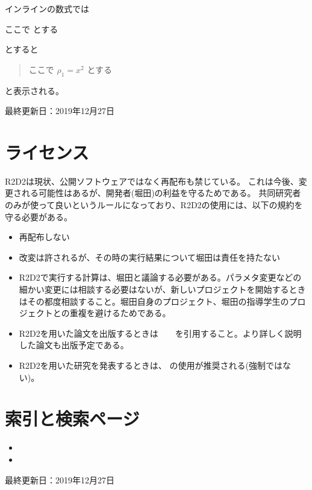 \documentclass[letterpaper,10pt,dvipdfmx,report]{sphinxmanual}
\begin{document}
インラインの数式では

\begin{sphinxVerbatim}[commandchars=\\\{\}]
ここで  とする
\end{sphinxVerbatim}

とすると
\begin{quote}

ここで \(\rho_1=x^2\) とする
\end{quote}

と表示される。

最終更新日：2019年12月27日


\chapter{ライセンス}
\label{\detokenize{index:id1}}
R2D2は現状、公開ソフトウェアではなく再配布も禁じている。
これは今後、変更される可能性はあるが、開発者(堀田)の利益を守るためである。
共同研究者のみが使って良いというルールになっており、R2D2の使用には、以下の規約を守る必要がある。
\begin{itemize}
\item {} 
再配布しない

\item {} 
改変は許されるが、その時の実行結果について堀田は責任を持たない

\item {} 
R2D2で実行する計算は、堀田と議論する必要がある。パラメタ変更などの細かい変更には相談する必要はないが、新しいプロジェクトを開始するときはその都度相談すること。堀田自身のプロジェクト、堀田の指導学生のプロジェクトとの重複を避けるためである。

\item {} 
R2D2を用いた論文を出版するときは　　を引用すること。より詳しく説明した論文も出版予定である。

\item {} 
R2D2を用いた研究を発表するときは、 の使用が推奨される(強制ではない)。

\end{itemize}


\chapter{索引と検索ページ}
\label{\detokenize{index:id3}}\begin{itemize}
\item {} 

\item {} 

\end{itemize}

最終更新日：2019年12月27日


\renewcommand{\indexname}{Pythonモジュール索引}
\begin{sphinxtheindex}
\let\bigletter\sphinxstyleindexlettergroup
\bigletter{r}
\item\relax{}
\end{sphinxtheindex}

\renewcommand{\indexname}{索引}
\printindex
\end{document}
